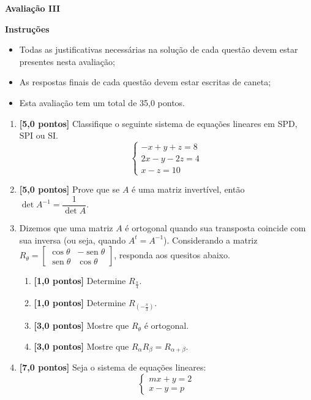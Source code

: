 \documentclass[12pt,a4paper]{article}
\DeclareMathOperator{\sen}{sen}
\begin{document}
\begin{center}
 \textbf{Avaliação III}
\end{center}

\textbf{Instruções}
\begin{itemize}
 \item Todas as justificativas necessárias na solução de cada questão devem estar presentes nesta avaliação;
 \item As respostas finais de cada questão devem estar escritas de caneta;
 \item Esta avaliação tem um total de 35,0 pontos.
\end{itemize}

\begin{enumerate}
  \item \textbf{[5,0 pontos]} Classifique o seguinte sistema de equações lineares em SPD, SPI ou SI.
  $$
    \begin{cases}
      -x + y + z = 8 \\
      2x - y - 2z = 4 \\
      x - z = 10
    \end{cases}
  $$

  \item \textbf{[5,0 pontos]} Prove que se $A$ é uma matriz invertível, então
  $\det A^{-1} = \dfrac{1}{\det A}$.

  \item Dizemos que uma matriz $A$ é ortogonal quando sua transposta coincide
    com sua inversa (ou seja, quando $A^t= A^{-1}$). Considerando a matriz
    $R_\theta=
      \begin{bmatrix}
        \cos \theta & -\sen \theta  \\
        \sen \theta & \cos \theta
      \end{bmatrix}$,
    responda aos quesitos abaixo.

    \begin{enumerate}
      \item \textbf{[1,0 pontos]} Determine $R_{\frac{\pi}{4}}$.
      \item \textbf{[1,0 pontos]} Determine $R_{\left(-\frac{\pi}{3}\right)}$.
      \item \textbf{[3,0 pontos]} Mostre que $R_\theta$ é ortogonal.
      \item \textbf{[3,0 pontos]} Mostre que $R_\alpha R_{\beta}=R_{\alpha +\beta}$.
    \end{enumerate}

  \item \textbf{[7,0 pontos]} Seja o sistema de equações lineares:
  $$
  \begin{cases}
    mx + y = 2 \\
    x - y = p
  \end{cases}
  $$


\end{enumerate}
\end{document}
